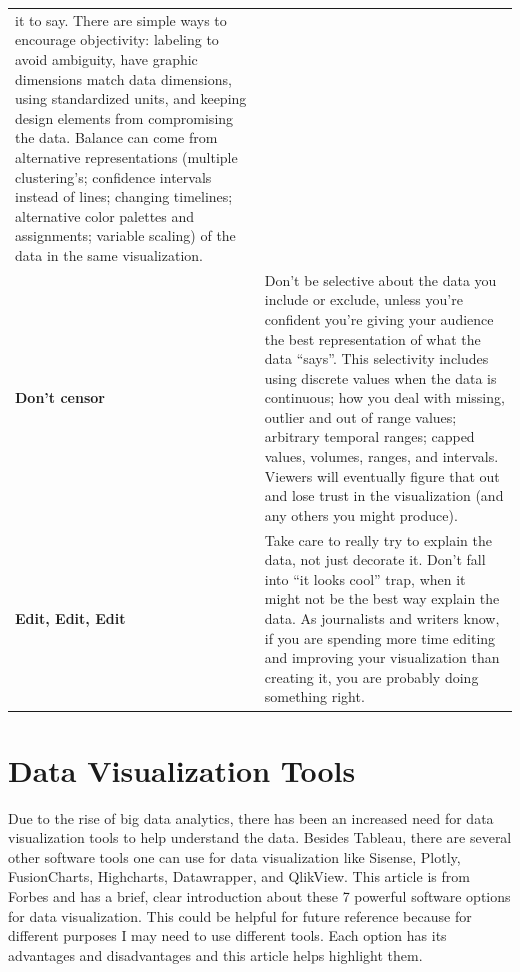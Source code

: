 \documentclass[]{book}
\begin{document}
\begin{longtable}[]{@{}ll@{}}
\begin{minipage}[t]{0.75\columnwidth}
it to say. There are simple ways to encourage objectivity: labeling to
avoid ambiguity, have graphic dimensions match data dimensions, using
standardized units, and keeping design elements from compromising the
data. Balance can come from alternative representations (multiple
clustering's; confidence intervals instead of lines; changing timelines;
alternative color palettes and assignments; variable scaling) of the
data in the same visualization.\strut
\end{minipage}\tabularnewline
\begin{minipage}[t]{0.19\columnwidth}\raggedright\strut
\textbf{Don't censor}\strut
\end{minipage} & \begin{minipage}[t]{0.75\columnwidth}\raggedright\strut
Don't be selective about the data you include or exclude, unless you're
confident you're giving your audience the best representation of what
the data ``says''. This selectivity includes using discrete values when
the data is continuous; how you deal with missing, outlier and out of
range values; arbitrary temporal ranges; capped values, volumes, ranges,
and intervals. Viewers will eventually figure that out and lose trust in
the visualization (and any others you might produce).\strut
\end{minipage}\tabularnewline
\begin{minipage}[t]{0.19\columnwidth}\raggedright\strut
\textbf{Edit, Edit, Edit}\strut
\end{minipage} & \begin{minipage}[t]{0.75\columnwidth}\raggedright\strut
Take care to really try to explain the data, not just decorate it. Don't
fall into ``it looks cool'' trap, when it might not be the best way
explain the data. As journalists and writers know, if you are spending
more time editing and improving your visualization than creating it, you
are probably doing something right.\strut
\end{minipage}\tabularnewline
\bottomrule
\end{longtable}

\section{Data Visualization Tools}\label{data-visualization-tools}

Due to the rise of big data analytics, there has been an increased need
for data visualization tools to help understand the data. Besides
Tableau, there are several other software tools one can use for data
visualization like Sisense, Plotly, FusionCharts, Highcharts,
Datawrapper, and QlikView. This article is from Forbes and has a brief,
clear introduction about these 7 powerful software options for data
visualization. This could be helpful for future reference because for
different purposes I may need to use different tools. Each option has
its advantages and disadvantages and this article helps highlight them.
\end{document}
